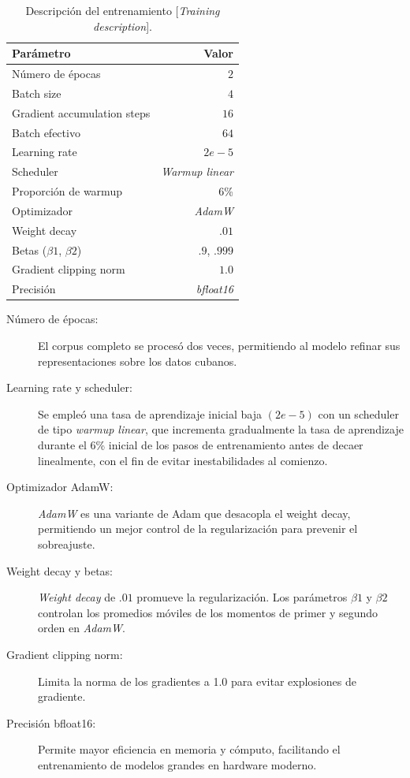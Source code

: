 \documentclass[10pt,twoside]{rcmart} %
\begin{document}
\begin{table}[hbt]
\caption{Descripción del entrenamiento [\textit{Training description}].}
\begin{center}
\begin{tabular}{lr}\hline\hline
Parámetro 					& Valor                  \\\hline\hline
Número de épocas            & $2$					 \\
Batch size                  & $4$					 \\
Gradient accumulation steps & $16$    				 \\
Batch efectivo              & $64$    				 \\
Learning rate               & $2e-5$				 \\
Scheduler                   & \textit{Warmup linear} \\
Proporción de warmup        & $6$\%					 \\
Optimizador                 & \textit{AdamW}		 \\
Weight decay                & $.01$					 \\
Betas ($\beta 1$, $\beta 2$)& $.9$, $.999$			 \\
Gradient clipping norm      & $1.0$					 \\
Precisión                   & \textit{bfloat16}      \\\hline\hline
\end{tabular}
\end{center}
\label{tab:desc-training}
\end{table}

\begin{description}
\item[Número de épocas:] El corpus completo se procesó dos veces, permitiendo al modelo refinar sus representaciones sobre los datos cubanos.
\item[Learning rate y scheduler:] Se empleó una tasa de aprendizaje inicial baja $(2e-5)$ con un scheduler de tipo \textit{warmup linear}, que incrementa gradualmente la tasa de aprendizaje durante el 6\% inicial de los pasos de entrenamiento antes de decaer linealmente, con el fin de evitar inestabilidades al comienzo.
\item[Optimizador AdamW:] \textit{AdamW} es una variante de Adam que desacopla el weight decay, permitiendo un mejor control de la regularización para prevenir el sobreajuste.
\item[Weight decay y betas:] \textit{Weight decay} de $.01$ promueve la regularización. Los parámetros $\beta 1$ y $\beta 2$ controlan los promedios móviles de los momentos de primer y segundo orden en \textit{AdamW}.
\item[Gradient clipping norm:] Limita la norma de los gradientes a 1.0 para evitar explosiones de gradiente.
\item[Precisión bfloat16:] Permite mayor eficiencia en memoria y cómputo, facilitando el entrenamiento de modelos grandes en hardware moderno.
\end{description}
\end{document}
